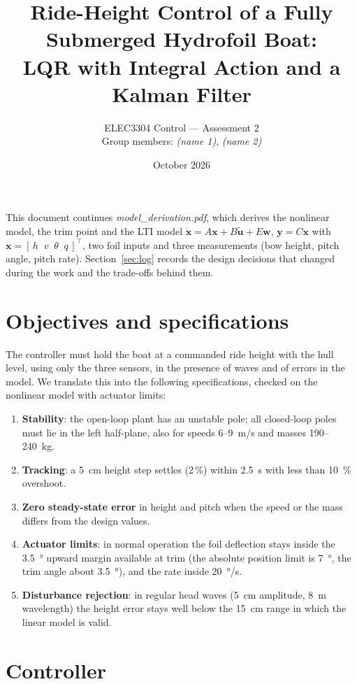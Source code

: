 \documentclass[11pt,a4paper]{article}
\title{Ride-Height Control of a Fully Submerged Hydrofoil Boat:\\
LQR with Integral Action and a Kalman Filter}
\author{ELEC3304 Control --- Assessment 2\\[2pt]
Group members: \emph{(name 1)}, \emph{(name 2)}}
\date{October 2026}
\newcommand{\T}{^{\top}}
\begin{document}
\maketitle

\noindent This document continues \emph{model\_derivation.pdf}, which derives the
nonlinear model, the trim point and the LTI model
$\dot{\bm x}=A\bm x+B\tilde{\bm u}+E\bm w$, $\bm y=C\bm x$ with
$\bm x=[\,h\;\;v\;\;\theta\;\;q\,]\T$, two foil inputs and three measurements
(bow height, pitch angle, pitch rate). Section~\ref{sec:log} records the design
decisions that changed during the work and the trade-offs behind them.

\section{Objectives and specifications}

The controller must hold the boat at a commanded ride height with the hull
level, using only the three sensors, in the presence of waves and of errors in
the model. We translate this into the following specifications, checked on the
nonlinear model with actuator limits:

\begin{enumerate}[label=R\arabic*.,leftmargin=2.4em]
\item \textbf{Stability}: the open-loop plant has an unstable pole; all
      closed-loop poles must lie in the left half-plane, also for speeds
      6--\SI{9}{m/s} and masses 190--\SI{240}{kg}.
\item \textbf{Tracking}: a \SI{5}{cm} height step settles (2\,\%) within
      \SI{2.5}{s} with less than \SI{10}{\percent} overshoot.
\item \textbf{Zero steady-state error} in height and pitch when the speed or the
      mass differs from the design values.
\item \textbf{Actuator limits}: in normal operation the foil deflection stays
      inside the \SI{+3.5}{\degree} upward margin available at trim (the
      absolute position limit is \SI{7}{\degree}, the trim angle about
      \SI{3.5}{\degree}), and the rate inside \SI{20}{\degree/s}.
\item \textbf{Disturbance rejection}: in regular head waves (\SI{5}{cm}
      amplitude, \SI{8}{m} wavelength) the height error stays well below the \SI{15}{cm} range in which
      the linear model is valid.
\end{enumerate}

\section{Controller}
\label{sec:control}
\end{document}
